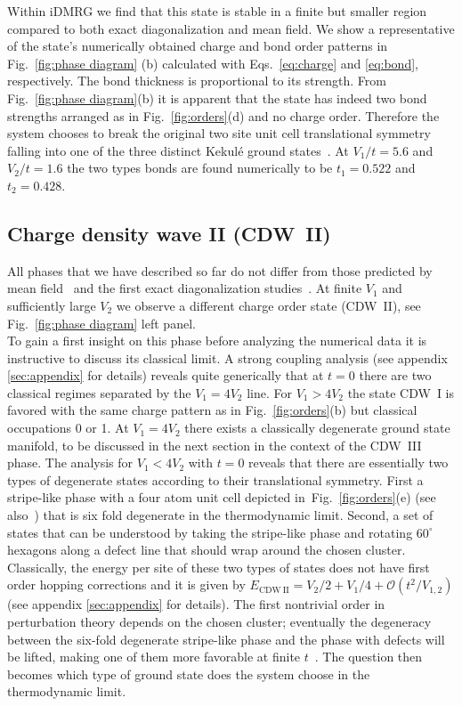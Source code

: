 \documentclass[aps,prx,10pt,twocolumn,floatfix,superscriptaddress,showpacs,numerical,footinbib]{revtex4-1}
\begin{document}
Within iDMRG we find that this state is stable in a finite but smaller region compared to both 
exact diagonalization and mean field.
%
We show a representative of the state's numerically obtained charge and bond order patterns in Fig.~\ref{fig:phase diagram} (b) 
calculated with Eqs.~\eqref{eq:charge} and \eqref{eq:bond}, respectively.
%
The bond thickness is proportional to its strength.
%
From Fig.~\ref{fig:phase diagram}(b) it is apparent that the state has indeed two bond strengths arranged as in Fig.~\ref{fig:orders}(d) 
and no charge order.
%
Therefore the system chooses to break the original two site unit cell translational symmetry 
falling into one of the three distinct Kekul\'{e} ground states~\cite{WF10}. 
%
At $V_{1}/t=5.6$ and $V_{2}/t=1.6$ the two types bonds are found numerically to be 
$t_{1}=0.522$ and $t_{2}=0.428$.

\subsection{Charge density wave II (CDW~II)}
%
All phases that we have described so far do not differ
from those predicted by mean field~\cite{RQHZ08,WF10,PR12,GCC13} 
and the first exact diagonalization studies~\cite{GGNVC13,DH14,DCH14}.
%
At finite $V_{1}$ and sufficiently large $V_{2}$ we observe
a different charge order state (CDW~II), see Fig.~\ref{fig:phase diagram} left panel.\\
%
To gain a first insight on this phase before analyzing the numerical data it is instructive to discuss its classical limit.
%
A strong coupling analysis (see appendix \ref{sec:appendix} for details) reveals quite generically 
that at $t=0$ there are two classical regimes separated by the $V_{1}=4V_{2}$ line. 
%
For $V_{1}>4V_{2}$ the state CDW~I is favored with the same charge pattern as in Fig.~\ref{fig:orders}(b) but classical occupations 0 or 1.
%
At $V_{1}=4V_{2}$ there exists a classically degenerate ground state manifold, to be discussed in the next section in the context of the CDW~III phase.
%
The analysis for $V_{1}<4V_{2}$ with $t=0$ reveals that there are essentially two types of degenerate states according to their translational symmetry.
%
First a stripe-like phase with a four atom unit cell depicted in~Fig.~\ref{fig:orders}(e) (see also~\cite{CL15}) that is six fold
degenerate in the thermodynamic limit.
%
Second, a set of states that can be understood by taking the stripe-like phase and rotating $60^{\circ}$ hexagons along a defect line that should wrap
around the chosen cluster.
%
Classically, the energy per site of these two types of states does not have first order hopping corrections and it is given by
$E_{\mathrm{CDW~II}} = V_2/2+V_1/4 + \mathcal{O}(t^2/V_{1,2})$ (see appendix \ref{sec:appendix} for details). 
%
The first nontrivial order in perturbation theory depends on the chosen cluster; eventually 
the degeneracy between the six-fold degenerate stripe-like phase and the phase with defects will be lifted, 
making one of them more favorable at finite $t$~\cite{CL15}.
%
The question then becomes which type of ground state does the system choose in the thermodynamic limit.\\
%
\end{document}
